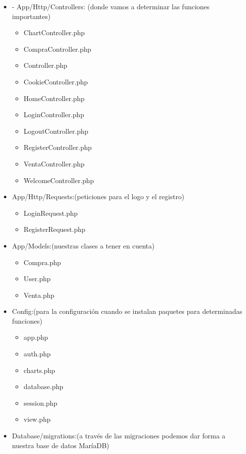 \documentclass{article}
\begin{document}
\begin{enumerate}
\begin{itemize}
    \item -	App/Http/Controllers: (donde vamos a determinar las funciones importantes)
        \begin{itemize}
            \item ChartController.php
            \item CompraController.php
            \item Controller.php
            \item CookieController.php
            \item HomeController.php
            \item LoginController.php
            \item LogoutController.php
            \item RegisterController.php
            \item VentaController.php
            \item WelcomeController.php
        \end{itemize}
    \item App/Http/Requests:(peticiones para el logo y el registro)
        \begin{itemize}
            \item LoginRequest.php
            \item RegisterRequest.php
        \end{itemize}
    \item App/Models:(nuestras clases a tener en cuenta)
        \begin{itemize}
            \item Compra.php
            \item User.php
            \item Venta.php
        \end{itemize}
    \item Config:(para la configuración cuando se instalan paquetes para determinadas funciones)
        \begin{itemize}
            \item app.php
            \item auth.php
            \item charts.php
            \item database.php
            \item session.php
            \item view.php
        \end{itemize}
    \item Database/migrations:(a través de las migraciones podemos dar forma a nuestra base de datos MaríaDB)

\end{itemize}
\end{enumerate}
\end{document}
